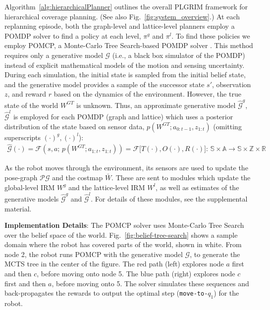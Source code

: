 \documentclass{article}
\newcommand{\ph}[1]{{\textbf{#1}:}} %
\begin{document}
Algorithm~\ref{alg:hierarchicalPlanner} outlines the overall PLGRIM framework for hierarchical coverage planning.  (See also Fig.~\ref{fig:system_overview}.)
At each replanning episode, both the graph-level and lattice-level planners employ a POMDP solver to find a policy at each level, $\pi^g$ and $\pi^l$.  To find these policies we employ POMCP, a Monte-Carlo Tree Search-based POMDP solver \cite{silver2010monte}.  This method requires only a generative model $\mathcal{G}$  (i.e., a black box simulator of the POMDP) instead of explicit mathematical models of the motion and sensing uncertainty. During each simulation, the initial state is sampled from the initial belief state, and the generative model provides a sample of the successor state $s'$, observation $z$, and reward $r$ based on the dynamics of the environment. However, the true state of the world $W^{GT}$ is unknown.  Thus, an approximate generative model $\hat{\mathcal{G}}^g$, $\hat{\mathcal{G}}^l$ is employed for each POMDP (graph and lattice) which uses a posterior distribution of the state  based on sensor data, $p(W^{GT}; a_{0:t-1}, z_{1:t})$ (omitting superscripts $(\cdot)^g, (\cdot)^l$):
\begin{align}
    \hat{\mathcal{G}}(\cdot) = \mathcal{F}(s, a; \, p(W^{GT}; a_{1:t}, z_{1:t})) = \mathcal{F}\big[T(\cdot), O(\cdot), R(\cdot)\big]: \, \mathbb{S} \times \mathbb{A} \rightarrow \mathbb{S} \times \mathbb{Z} \times \mathbb{R}
\end{align}

As the robot moves through the environment, its sensors are used to update the pose-graph $\mathcal{PG}$ and the %
costmap $\bar{W}$.  These are sent to modules which update the global-level IRM $W^g$ and the lattice-level IRM $W^l$, as well as estimates of the generative models $\hat{\mathcal{G}}^g$ and $\hat{\mathcal{G}}^l$. For details of these modules, see the supplemental material.

\ph{Implementation Details}
The POMCP solver uses Monte-Carlo Tree Search over the belief space of the world. Fig.~\ref{fig:belief-tree-search} shows a sample domain where the robot has covered parts of the world, shown in white. From node 2, the robot runs POMCP with the generative model $\mathcal{G}$, to generate the MCTS tree in the center of the figure. The red path (left) explores node $a$ first and then $c$, before moving onto node 5. The blue path (right) explores node $c$ first and then $a$, before moving onto 5. The solver simulates these sequences and back-propagates the rewards to output the optimal step (\texttt{move-to-$q_1$}) for the robot.
\end{document}

